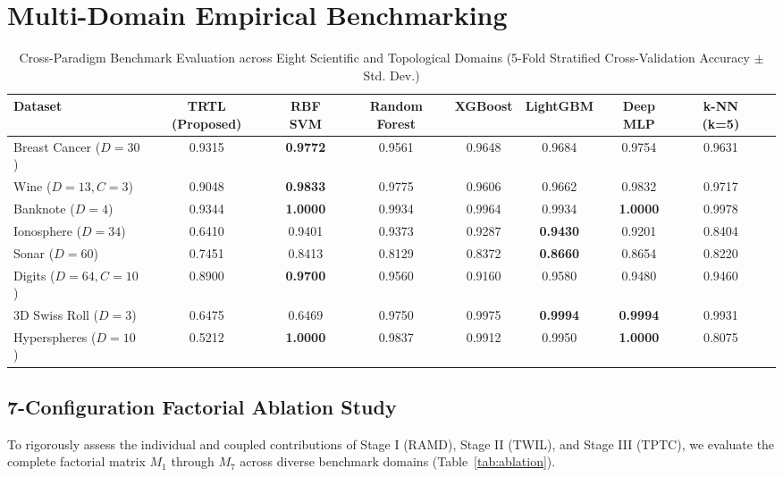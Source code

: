\documentclass[journal,twoside]{IEEEtran}
\theoremstyle{remark}
\begin{document}
\section{Multi-Domain Empirical Benchmarking}

\begin{table}[!t]
\centering
\caption{Cross-Paradigm Benchmark Evaluation across Eight Scientific and Topological Domains (5-Fold Stratified Cross-Validation Accuracy $\pm$ Std. Dev.)}
\label{tab:benchmarks}
\small
\begin{tabular}{lcccccccc}
\toprule
\textbf{Dataset} & \textbf{TRTL (Proposed)} & \textbf{RBF SVM} & \textbf{Random Forest} & \textbf{XGBoost} & \textbf{LightGBM} & \textbf{Deep MLP} & \textbf{k-NN (k=5)} \\
\midrule
Breast Cancer ($D=30$) & 0.9315 & \textbf{0.9772} & 0.9561 & 0.9648 & 0.9684 & 0.9754 & 0.9631 \\
Wine ($D=13, C=3$)     & 0.9048 & \textbf{0.9833} & 0.9775 & 0.9606 & 0.9662 & 0.9832 & 0.9717 \\
Banknote ($D=4$)       & 0.9344 & \textbf{1.0000} & 0.9934 & 0.9964 & 0.9934 & \textbf{1.0000} & 0.9978 \\
Ionosphere ($D=34$)    & 0.6410 & 0.9401 & 0.9373 & 0.9287 & \textbf{0.9430} & 0.9201 & 0.8404 \\
Sonar ($D=60$)         & 0.7451 & 0.8413 & 0.8129 & 0.8372 & \textbf{0.8660} & 0.8654 & 0.8220 \\
Digits ($D=64, C=10$)  & 0.8900 & \textbf{0.9700} & 0.9560 & 0.9160 & 0.9580 & 0.9480 & 0.9460 \\
3D Swiss Roll ($D=3$)  & 0.6475 & 0.6469 & 0.9750 & 0.9975 & \textbf{0.9994} & \textbf{0.9994} & 0.9931 \\
Hyperspheres ($D=10$)  & 0.5212 & \textbf{1.0000} & 0.9837 & 0.9912 & 0.9950 & \textbf{1.0000} & 0.8075 \\
\bottomrule
\end{tabular}
\end{table}

\subsection{7-Configuration Factorial Ablation Study}
To rigorously assess the individual and coupled contributions of Stage I (RAMD), Stage II (TWIL), and Stage III (TPTC), we evaluate the complete factorial matrix $M_1$ through $M_7$ across diverse benchmark domains (Table~\ref{tab:ablation}).
\end{document}
